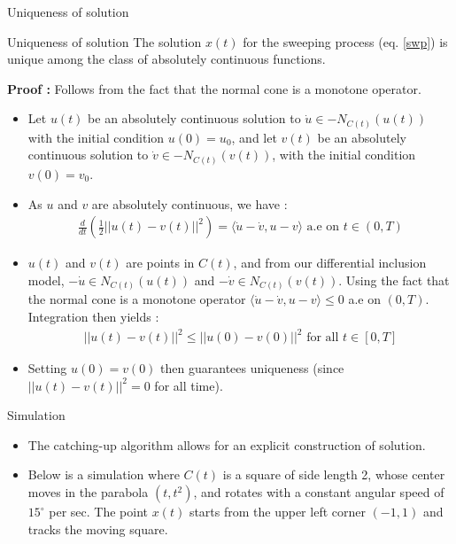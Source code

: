 \documentclass[8pt,aspectratio=169]{beamer}
\begin{document}
\begin{frame}[fragile]{Uniqueness of solution}
    \begin{block}{Uniqueness of solution}
        The solution $x(t)$ for the sweeping process (eq. \ref{swp}) is unique among the class of absolutely continuous functions.
    \end{block}
    
    \textbf{Proof : } Follows from the fact that the normal cone is a monotone operator.
    \begin{itemize}
        \item Let $u(t)$ be an absolutely continuous solution to $\dot{u} \in -N_{C(t)}(u(t))$ with the initial condition $u(0) = u_0$, and let $v(t)$ be an absolutely continuous solution to $\dot{v} \in -N_{C(t)}(v(t))$, with the initial condition $v(0) = v_0$.
        \item As $u$ and $v$ are absolutely continuous, we have : 
            \begin{align*}
            \frac{d}{dt} \left(\frac{1}{2} ||u(t) - v(t)||^2\right) = \langle \dot{u} - \dot{v}, u-v \rangle \text{ a.e on } t \in (0, T)
            \end{align*}
        \item $u(t)$ and $v(t)$ are points in $C(t)$, and from our differential inclusion model,  $-\dot{u} \in N_{C(t)}(u(t))$ and $-\dot{v} \in N_{C(t)}(v(t))$. Using the fact that the normal cone is a monotone operator $\langle \dot{u} - \dot{v}, u-v \rangle \leq 0$ a.e on $(0, T)$. Integration then yields :
        \begin{align*}
            ||u(t) - v(t)||^2 \leq ||u(0) - v(0)||^2 \text{ for all } t\in [0, T]
        \end{align*}
        \item Setting $u(0) = v(0)$ then guarantees uniqueness (since $||u(t) - v(t)||^2 = 0$ for all time).
    \end{itemize}
\end{frame}

\begin{frame}{Simulation}
    \begin{itemize}
        \item The catching-up algorithm allows for an explicit construction of solution.
        \item Below is a simulation where $C(t)$ is a square of side length 2, whose center moves in the parabola $(t, t^2)$, and rotates with a constant angular speed of $15^\circ$ per sec. The point $x(t)$ starts from the upper left corner $(-1, 1)$ and tracks the moving square.
    \end{itemize}
    \centering
\end{frame}
\end{document}
